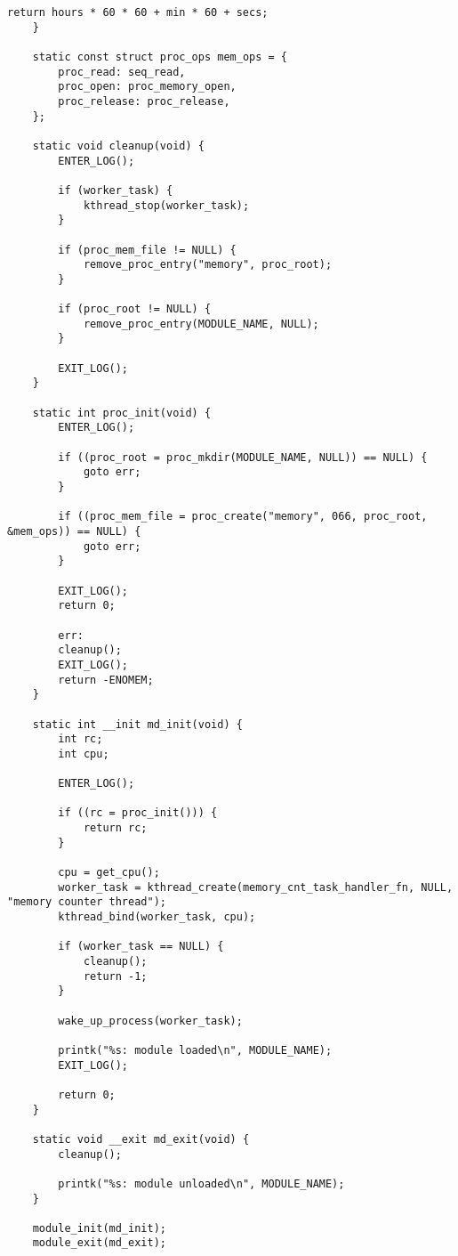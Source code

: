 \begin{lstlisting}[caption={листинг файла monitor\_main.c}]
		return hours * 60 * 60 + min * 60 + secs;
	}
	
	static const struct proc_ops mem_ops = {
		proc_read: seq_read,
		proc_open: proc_memory_open,
		proc_release: proc_release,
	};
	
	static void cleanup(void) {
		ENTER_LOG();
		
		if (worker_task) {
			kthread_stop(worker_task);
		}
		
		if (proc_mem_file != NULL) {
			remove_proc_entry("memory", proc_root);
		}
		
		if (proc_root != NULL) {
			remove_proc_entry(MODULE_NAME, NULL);
		}
		
		EXIT_LOG();
	}
	
	static int proc_init(void) {
		ENTER_LOG();
		
		if ((proc_root = proc_mkdir(MODULE_NAME, NULL)) == NULL) {
			goto err;
		}
		
		if ((proc_mem_file = proc_create("memory", 066, proc_root, &mem_ops)) == NULL) {
			goto err;
		}
		
		EXIT_LOG();
		return 0;
		
		err:
		cleanup();
		EXIT_LOG();
		return -ENOMEM;
	}
	
	static int __init md_init(void) {
		int rc;
		int cpu;
		
		ENTER_LOG();
		
		if ((rc = proc_init())) {
			return rc;
		}
		
		cpu = get_cpu();
		worker_task = kthread_create(memory_cnt_task_handler_fn, NULL, "memory counter thread");
		kthread_bind(worker_task, cpu);
		
		if (worker_task == NULL) {
			cleanup();
			return -1;
		}
		
		wake_up_process(worker_task);
		
		printk("%s: module loaded\n", MODULE_NAME);
		EXIT_LOG();
		
		return 0;
	}
	
	static void __exit md_exit(void) { 
		cleanup();
		
		printk("%s: module unloaded\n", MODULE_NAME); 
	}
	
	module_init(md_init);
	module_exit(md_exit);
\end{lstlisting}

